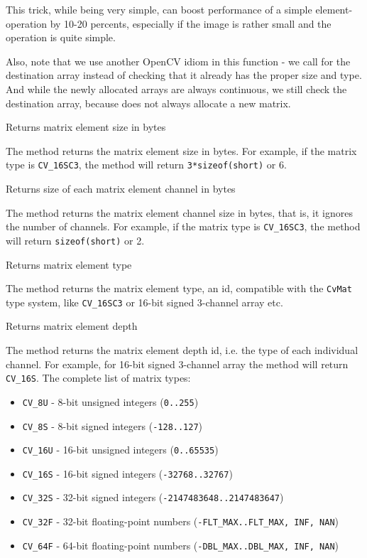 This trick, while being very simple, can boost performance of a simple element-operation by 10-20 percents, especially if the image is rather small and the operation is quite simple.

Also, note that we use another OpenCV idiom in this function - we call  for the destination array instead of checking that it already has the proper size and type. And while the newly allocated arrays are always continuous, we still check the destination array, because  does not always allocate a new matrix.

Returns matrix element size in bytes


The method returns the matrix element size in bytes. For example, if the matrix type is \texttt{CV\_16SC3}, the method will return \texttt{3*sizeof(short)} or 6.

Returns size of each matrix element channel in bytes


The method returns the matrix element channel size in bytes, that is, it ignores the number of channels. For example, if the matrix type is \texttt{CV\_16SC3}, the method will return \texttt{sizeof(short)} or 2.

Returns matrix element type


The method returns the matrix element type, an id, compatible with the \texttt{CvMat} type system, like \texttt{CV\_16SC3} or 16-bit signed 3-channel array etc.

Returns matrix element depth


The method returns the matrix element depth id, i.e. the type of each individual channel. For example, for 16-bit signed 3-channel array the method will return \texttt{CV\_16S}. The complete list of matrix types:
\begin{itemize}
\item \texttt{CV\_8U} - 8-bit unsigned integers (\texttt{0..255})
\item \texttt{CV\_8S} - 8-bit signed integers (\texttt{-128..127})
\item \texttt{CV\_16U} - 16-bit unsigned integers (\texttt{0..65535})
\item \texttt{CV\_16S} - 16-bit signed integers (\texttt{-32768..32767})
\item \texttt{CV\_32S} - 32-bit signed integers (\texttt{-2147483648..2147483647})
\item \texttt{CV\_32F} - 32-bit floating-point numbers (\texttt{-FLT\_MAX..FLT\_MAX, INF, NAN})
\item \texttt{CV\_64F} - 64-bit floating-point numbers (\texttt{-DBL\_MAX..DBL\_MAX, INF, NAN})
\end{itemize}


